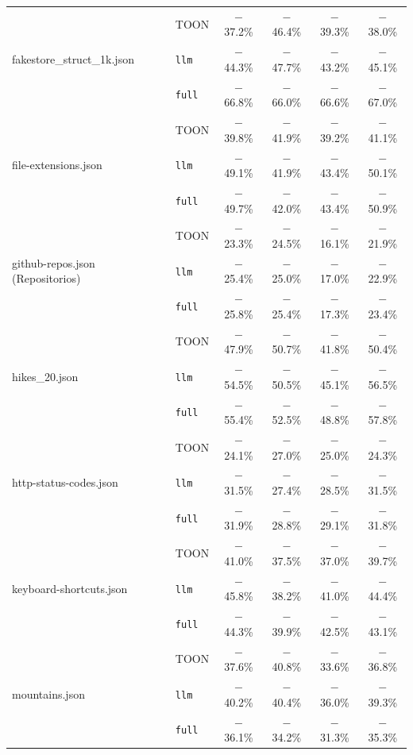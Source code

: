 \begin{table}[t]
\begin{tabular}{@{}llcccc@{}}
    \cline{2-6}
    \multirow{3}{*}{fakestore\_struct\_1k.json} & TOON & $-$37.2\% & $-$46.4\% & $-$39.3\% & $-$38.0\% \\
     & \texttt{llm} & $-$44.3\% & $-$47.7\% & $-$43.2\% & $-$45.1\% \\
     & \texttt{full} & $-$66.8\% & $-$66.0\% & $-$66.6\% & $-$67.0\% \\
    \cline{2-6}
    \multirow{3}{*}{file-extensions.json} & TOON & $-$39.8\% & $-$41.9\% & $-$39.2\% & $-$41.1\% \\
     & \texttt{llm} & $-$49.1\% & $-$41.9\% & $-$43.4\% & $-$50.1\% \\
     & \texttt{full} & $-$49.7\% & $-$42.0\% & $-$43.4\% & $-$50.9\% \\
    \cline{2-6}
    \multirow{3}{*}{github-repos.json (Repositorios)} & TOON & $-$23.3\% & $-$24.5\% & $-$16.1\% & $-$21.9\% \\
     & \texttt{llm} & $-$25.4\% & $-$25.0\% & $-$17.0\% & $-$22.9\% \\
     & \texttt{full} & $-$25.8\% & $-$25.4\% & $-$17.3\% & $-$23.4\% \\
    \cline{2-6}
    \multirow{3}{*}{hikes\_20.json} & TOON & $-$47.9\% & $-$50.7\% & $-$41.8\% & $-$50.4\% \\
     & \texttt{llm} & $-$54.5\% & $-$50.5\% & $-$45.1\% & $-$56.5\% \\
     & \texttt{full} & $-$55.4\% & $-$52.5\% & $-$48.8\% & $-$57.8\% \\
    \cline{2-6}
    \multirow{3}{*}{http-status-codes.json} & TOON & $-$24.1\% & $-$27.0\% & $-$25.0\% & $-$24.3\% \\
     & \texttt{llm} & $-$31.5\% & $-$27.4\% & $-$28.5\% & $-$31.5\% \\
     & \texttt{full} & $-$31.9\% & $-$28.8\% & $-$29.1\% & $-$31.8\% \\
    \cline{2-6}
    \multirow{3}{*}{keyboard-shortcuts.json} & TOON & $-$41.0\% & $-$37.5\% & $-$37.0\% & $-$39.7\% \\
     & \texttt{llm} & $-$45.8\% & $-$38.2\% & $-$41.0\% & $-$44.4\% \\
     & \texttt{full} & $-$44.3\% & $-$39.9\% & $-$42.5\% & $-$43.1\% \\
    \cline{2-6}
    \multirow{3}{*}{mountains.json} & TOON & $-$37.6\% & $-$40.8\% & $-$33.6\% & $-$36.8\% \\
     & \texttt{llm} & $-$40.2\% & $-$40.4\% & $-$36.0\% & $-$39.3\% \\
     & \texttt{full} & $-$36.1\% & $-$34.2\% & $-$31.3\% & $-$35.3\% \\

\end{tabular}
\end{table}
